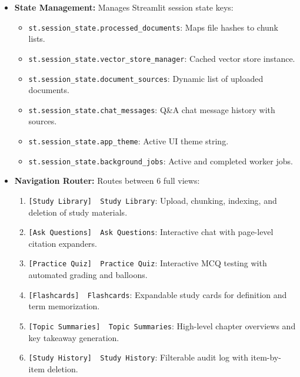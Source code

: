 \documentclass[
]{article}
\providecommand{\tightlist}{%
  \setlength{\itemsep}{0pt}\setlength{\parskip}{0pt}}
\begin{document}
\begin{itemize}
\tightlist
\item
  \textbf{State Management:} Manages Streamlit session state keys:

  \begin{itemize}
  \tightlist
  \item
    \texttt{st.\allowbreak session\_\allowbreak state.\allowbreak processed\_\allowbreak documents}: Maps file hashes to
    chunk lists.
  \item
    \texttt{st.\allowbreak session\_\allowbreak state.\allowbreak vector\_\allowbreak store\_\allowbreak manager}: Cached vector
    store instance.
  \item
    \texttt{st.\allowbreak session\_\allowbreak state.\allowbreak document\_\allowbreak sources}: Dynamic list of
    uploaded documents.
  \item
    \texttt{st.\allowbreak session\_\allowbreak state.\allowbreak chat\_\allowbreak messages}: Q\&A chat message history
    with sources.
  \item
    \texttt{st.\allowbreak session\_\allowbreak state.\allowbreak app\_\allowbreak theme}: Active UI theme string.
  \item
    \texttt{st.\allowbreak session\_\allowbreak state.\allowbreak background\_\allowbreak jobs}: Active and completed
    worker jobs.
  \end{itemize}
\item
  \textbf{Navigation Router:} Routes between 6 full views:

  \begin{enumerate}
  \def\labelenumi{\arabic{enumi}.}
  \tightlist
  \item
    \texttt{{[}Study\ \allowbreak Library{]}\ \allowbreak \ \allowbreak Study\ \allowbreak Library}: Upload, chunking,
    indexing, and deletion of study materials.
  \item
    \texttt{{[}Ask\ \allowbreak Questions{]}\ \allowbreak \ \allowbreak Ask\ \allowbreak Questions}: Interactive chat
    with page-level citation expanders.
  \item
    \texttt{{[}Practice\ \allowbreak Quiz{]}\ \allowbreak \ \allowbreak Practice\ \allowbreak Quiz}: Interactive MCQ
    testing with automated grading and balloons.
  \item
    \texttt{{[}Flashcards{]}\ \allowbreak \ \allowbreak Flashcards}: Expandable study cards for
    definition and term memorization.
  \item
    \texttt{{[}Topic\ \allowbreak Summaries{]}\ \allowbreak \ \allowbreak Topic\ \allowbreak Summaries}: High-level
    chapter overviews and key takeaway generation.
  \item
    \texttt{{[}Study\ \allowbreak History{]}\ \allowbreak \ \allowbreak Study\ \allowbreak History}: Filterable audit
    log with item-by-item deletion.
  \end{enumerate}
\end{itemize}
\end{document}
